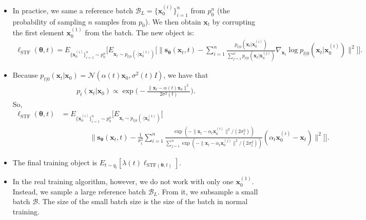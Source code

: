 \documentclass[10pt]{article}
\newcommand{\ve}[1]{\mathbf{#1}}
\newcommand{\ves}[1]{\boldsymbol{#1}}
\newcommand{\mrm}[1]{\mathrm{#1}}
\newcommand{\mcal}[1]{\mathcal{#1}}
\begin{document}
\begin{itemize}
  \item In practice, we same a reference batch $\mcal{B}_L = \{ \ve{x}^{(i)}_0 \}_{i=1}^n$ from $p_0^n$ (the probability of sampling $n$ samples from $p_0$). We then obtain $\ve{x}_t$ by corrupting the first element $\ve{x}^{(1)}_0$ from the batch. The new object is:
  \begin{align*}
    \ell_{\mrm{STF}}(\ves{\theta},t) = E_{\{ \ve{x}^{(i)}_0 \}_{i=1}^n \sim p_0^n} \Bigg[
      E_{\ve{x}_t \sim p_{t|0}(\cdot|\ve{x}^{(1)}_0)} \bigg[
        \Big\|
          \ve{s}_{\ves{\theta}}(\ve{x}_t, t) - \sum_{i=1}^n \frac{p_{t|0}(\ve{x}_t|\ve{x}^{(i)}_0)}{\sum_{j=1}^n p_{t|0}(\ve{x}_t|\ve{x}_0^{(j)})} \nabla_{\ve{x}_t} \log p_{t|0} (\ve{x}_t|\ve{x}^{(i)}_{0})
        \Big\|^2
      \bigg]
    \Bigg].
  \end{align*}
  
  \item Because $p_{t|0}(\ve{x}_t|\ve{x}_0) = \mcal{N}(\alpha(t)\ve{x}_0, \sigma^2(t) I)$, we have that
  \begin{align*}
    p_t(\ve{x}_t|\ve{x}_0) \propto \exp\bigg( -\frac{\| \ve{x}_t - \alpha(t)\ve{x}_0 \|^2}{2\sigma^2(t)} \bigg).
  \end{align*}
  So,
  \begin{align*}
    \ell_{\mrm{STF}}(\ves{\theta},t) &= E_{\{ \ve{x}^{(i)}_0 \}_{i=1}^n \sim p_0^n} \Bigg[
      E_{\ve{x}_t \sim p_{t|0}(\cdot|\ve{x}^{(1)}_0)} \bigg[ \\
        &\qquad \qquad \Big\|
          \ve{s}_{\ves{\theta}}(\ve{x}_t, t) - \frac{1}{\sigma_t^2} \sum_{i=1}^n \frac{ \exp(-\| \ve{x}_t - \alpha_t\ve{x}_0^{(i)} \|^2 /(2\sigma_t^2)) }{\sum_{j=1}^n \exp(-\| \ve{x}_t - \alpha_t\ve{x}_0^{(j)} \|^2 /(2\sigma_t^2))} (\alpha_t \ve{x}_0^{(i)} - \ve{x}_t)
        \Big\|^2
      \bigg]
    \Bigg].
  \end{align*}  

  \item The final training object is $E_{t \sim q_t} [\lambda(t) \ell_{\mrm{STF}(\ves{\theta},t)}]$.
  
  \item In the real training algorithm, however, we do not work with only one $\ve{x}^{(1)}_0$. Instead, we sample a large reference batch $\mcal{B}_L$. From it, we subsample a small batch $\mcal{B}$. The size of the small batch size is the size of the batch in normal training.
  

\end{itemize}
\end{document}
